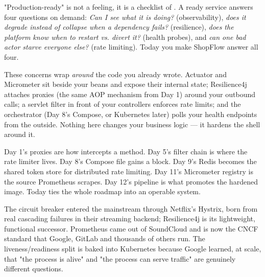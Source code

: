 \begin{keyidea}
"Production-ready" is not a feeling, it is a checklist of . A ready service answers four questions on demand: \emph{Can I see what it is doing?} (observability), \emph{does it degrade instead of collapse when a dependency fails?} (resilience), \emph{does the platform know when to restart vs. divert it?} (health probes), and \emph{can one bad actor starve everyone else?} (rate limiting). Today you make ShopFlow answer all four.
\end{keyidea}

 These concerns wrap \emph{around} the code you already wrote. Actuator and Micrometer sit beside your beans and expose their internal state; Resilience4j attaches proxies (the same AOP mechanism from Day 1) around your outbound calls; a servlet filter in front of your controllers enforces rate limits; and the orchestrator (Day 8's Compose, or Kubernetes later) polls your health endpoints from the outside. Nothing here changes your business logic --- it hardens the shell around it.

 Day 1's proxies are how  intercepts a method. Day 5's filter chain is where the rate limiter lives. Day 8's Compose file gains a  block. Day 9's Redis becomes the shared token store for distributed rate limiting. Day 11's Micrometer registry is the source Prometheus scrapes. Day 12's pipeline is what promotes the hardened image. Today ties the whole roadmap into an operable system.

 The circuit breaker entered the mainstream through Netflix's Hystrix, born from real cascading failures in their streaming backend; Resilience4j is its lightweight, functional successor. Prometheus came out of SoundCloud and is now the CNCF standard that Google, GitLab and thousands of others run. The liveness/readiness split is baked into Kubernetes because Google learned, at scale, that "the process is alive" and "the process can serve traffic" are genuinely different questions.


